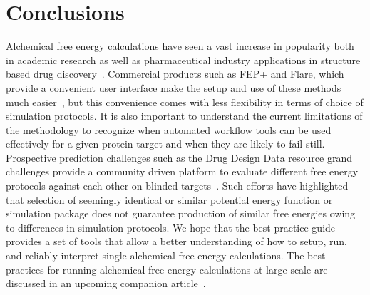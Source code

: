 \documentclass[9pt,bestpractices]{livecoms}
\begin{document}
\section{Conclusions}
\label{sec:conclusion}
Alchemical free energy calculations have seen a vast increase in popularity both in academic research as well as pharmaceutical industry applications in structure based drug discovery~\cite{schindler2020largescale, sherborne2016collaborating, wagner2017computational}. Commercial products such as FEP+ and Flare, which provide a convenient user interface make the setup and use of these methods much easier~\cite{wang2015accurate, kuhn2020assessment}, but this convenience comes with less flexibility in terms of choice of simulation protocols. It is also important to understand the current limitations of the methodology to recognize when automated workflow tools can be used effectively for a given protein target and when they are likely to fail still. Prospective prediction challenges such as the Drug Design Data resource grand challenges provide a community driven platform to evaluate different free energy protocols against each other on blinded targets~\cite{gaieb2018d3r, gaieb2019d3r}. Such efforts have highlighted that selection of seemingly identical or similar potential energy function or simulation package does not guarantee production of similar free energies owing to differences in simulation protocols. 
We hope that the best practice guide provides a set of tools that allow a better understanding of how to setup, run, and reliably interpret single alchemical free energy calculations. The best practices for running alchemical free energy calculations at large scale are discussed in an upcoming companion article~\cite{mey_largescale_inprep}.
\end{document}
